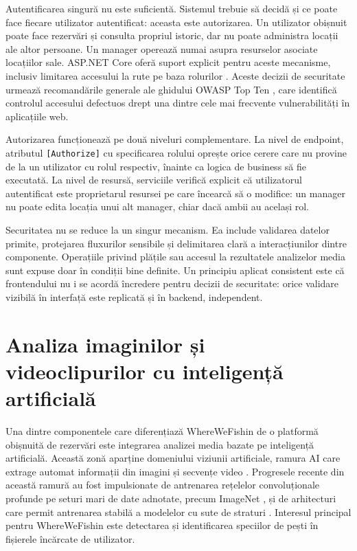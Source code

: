 Autentificarea singură nu este suficientă. Sistemul trebuie să decidă și ce poate face fiecare utilizator autentificat: aceasta este autorizarea. Un utilizator obișnuit poate face rezervări și consulta propriul istoric, dar nu poate administra locații ale altor persoane. Un manager operează numai asupra resurselor asociate locațiilor sale. ASP.NET Core oferă suport explicit pentru aceste mecanisme, inclusiv limitarea accesului la rute pe baza rolurilor \citep{aspnetcore}. Aceste decizii de securitate urmează recomandările generale ale ghidului OWASP Top Ten \citep{owasp}, care identifică controlul accesului defectuos drept una dintre cele mai frecvente vulnerabilități în aplicațiile web.

Autorizarea funcționează pe două niveluri complementare. La nivel de endpoint, atributul \texttt{[Authorize]} cu specificarea rolului oprește orice cerere care nu provine de la un utilizator cu rolul respectiv, înainte ca logica de business să fie executată. La nivel de resursă, serviciile verifică explicit că utilizatorul autentificat este proprietarul resursei pe care încearcă să o modifice: un manager nu poate edita locația unui alt manager, chiar dacă ambii au același rol.

Securitatea nu se reduce la un singur mecanism. Ea include validarea datelor primite, protejarea fluxurilor sensibile și delimitarea clară a interacțiunilor dintre componente. Operațiile privind plățile sau accesul la rezultatele analizelor media sunt expuse doar în condiții bine definite. Un principiu aplicat consistent este că frontendului nu i se acordă încredere pentru decizii de securitate: orice validare vizibilă în interfață este replicată și în backend, independent.

\section{Analiza imaginilor și videoclipurilor cu inteligență artificială}

Una dintre componentele care diferențiază WhereWeFishin de o platformă obișnuită de rezervări este integrarea analizei media bazate pe inteligență artificială. Această zonă aparține domeniului viziunii artificiale, ramura AI care extrage automat informații din imagini și secvențe video \citep{szeliski2022,goodfellow2016}. Progresele recente din această ramură au fost impulsionate de antrenarea rețelelor convoluționale profunde pe seturi mari de date adnotate, precum ImageNet \citep{krizhevsky2012alexnet}, și de arhitecturi care permit antrenarea stabilă a modelelor cu sute de straturi \citep{he2016resnet}. Interesul principal pentru WhereWeFishin este detectarea și identificarea speciilor de pești în fișierele încărcate de utilizator.


